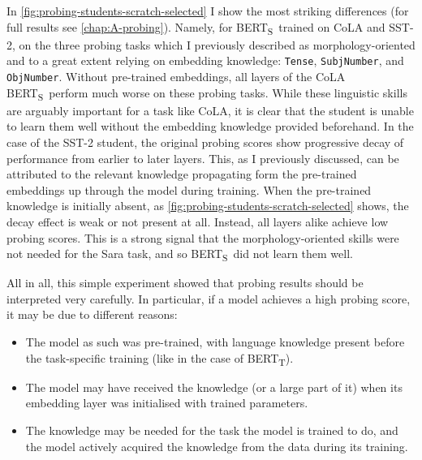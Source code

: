 \documentclass[bsc,frontabs,twoside,singlespacing,parskip,deptreport]{infthesis}
\def\BERTT{BERT\textsubscript{T}}
\def\BERTS{BERT\textsubscript{S}}
\begin{document}
{{{      In \autoref{fig:probing-students-scratch-selected} I show the most striking differences (for full results see \autoref{chap:A-probing}). Namely, for \BERTS~trained on CoLA and SST-2, on the three probing tasks which I previously described as morphology-oriented and to a great extent relying on embedding knowledge: \verb|Tense|, \verb|SubjNumber|, and \verb|ObjNumber|.
      Without pre-trained embeddings, all layers of the CoLA \BERTS~perform much worse on these probing tasks. While these linguistic skills are arguably important for a task like CoLA, it is clear that the student is unable to learn them well without the embedding knowledge provided beforehand.
      In the case of the SST-2 student, the original probing scores show progressive decay of performance from earlier to later layers. This, as I previously discussed, can be attributed to the relevant knowledge propagating form the pre-trained embeddings up through the model during training. When the pre-trained knowledge is initially absent, as \autoref{fig:probing-students-scratch-selected} shows, the decay effect is weak or not present at all. Instead, all layers alike achieve low probing scores. This is a strong signal that the morphology-oriented skills were not needed for the Sara task, and so \BERTS~did not learn them well.

      All in all, this simple experiment showed that probing results should be interpreted very carefully. In particular, if a model achieves a high probing score, it may be due to different reasons:
      \begin{itemize}
        \item The model as such was pre-trained, with language knowledge present before the task-specific training (like in the case of \BERTT).
        \item The model may have received the knowledge (or a large part of it) when its embedding layer was initialised with trained parameters.
        \item The knowledge may be needed for the task the model is trained to do, and the model actively acquired the knowledge from the data during its training.
      \end{itemize}
    }
  }

}
\end{document}
